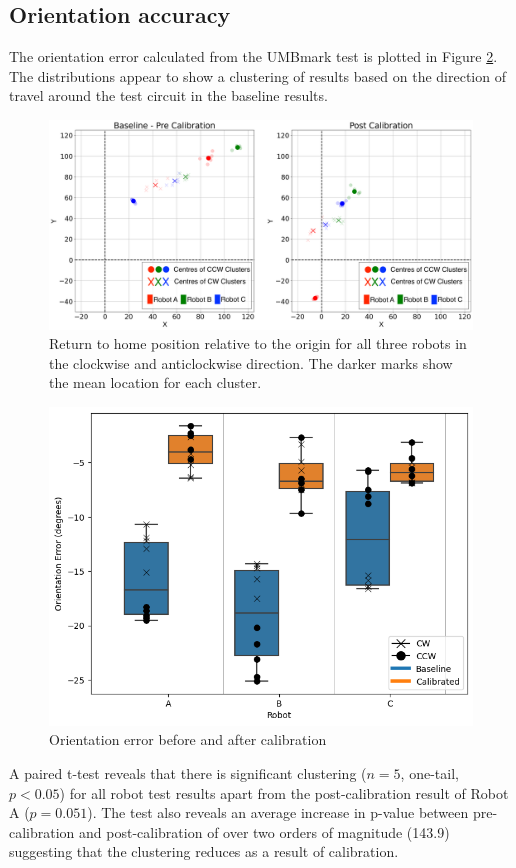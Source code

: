 \documentclass[conference]{IEEEtran}
\begin{document}
\subsection{Orientation accuracy}

The orientation error calculated from the UMBmark test is plotted in Figure \ref{fig:orientation}. The distributions appear to show a clustering of results based on the direction of travel around the test circuit in the baseline results.

\begin{figure}[h!]
    \centering
    \includegraphics[width=.9\textwidth]{img/xy_pre_post_2.png}
    \caption{Return to home position relative to the origin for all three robots in the clockwise and anticlockwise direction. The darker marks show the mean location for each cluster.}
    \label{fig:xy_scatter}
\end{figure}

\begin{figure}[h!]
    \centering
    \includegraphics[width=.45\textwidth]{img/orientation_error.png}
    \caption{Orientation error before and after calibration}
    \label{fig:orientation}
\end{figure}



A paired t-test reveals that there is significant clustering ($n = 5$, one-tail, $p < 0.05$) for all robot test results apart from the post-calibration result of Robot A ($p=0.051$). The test also reveals an average increase in p-value between pre-calibration and post-calibration of over two orders of magnitude (143.9) suggesting that the clustering reduces as a result of calibration. 
\end{document}
